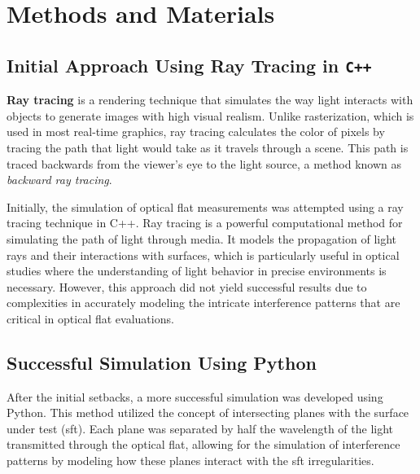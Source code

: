 \documentclass[../main.tex]{subfiles}
\begin{document}
{\let\clearpage\relax\chapter{Methods and Materials}}
\vspace{-5pt}
\section{Initial Approach Using Ray Tracing in \texttt{C++}}
\vspace{-15pt}
\textbf{Ray tracing} is a rendering technique that simulates the way light interacts with objects to generate images with high visual realism. Unlike rasterization, which is used in most real-time graphics, ray tracing calculates the color of pixels by tracing the path that light would take as it travels through a scene. This path is traced backwards from the viewer's eye to the light source, a method known as \textit{backward ray tracing}.

Initially, the simulation of optical flat measurements was attempted using a ray tracing technique in C++. Ray tracing is a powerful computational method for simulating the path of light through media. It models the propagation of light rays and their interactions with surfaces, which is particularly useful in optical studies where the understanding of light behavior in precise environments is necessary. However, this approach did not yield successful results due to complexities in accurately modeling the intricate interference patterns that are critical in optical flat evaluations.
\vspace{-15pt}
\section{Successful Simulation Using Python}
\vspace{-15pt}
After the initial setbacks, a more successful simulation was developed using Python. This method utilized the concept of intersecting planes with the surface under test (sft). Each plane was separated by half the wavelength of the light transmitted through the optical flat, allowing for the simulation of interference patterns by modeling how these planes interact with the sft irregularities.
\vspace{-15pt}
\end{document}
